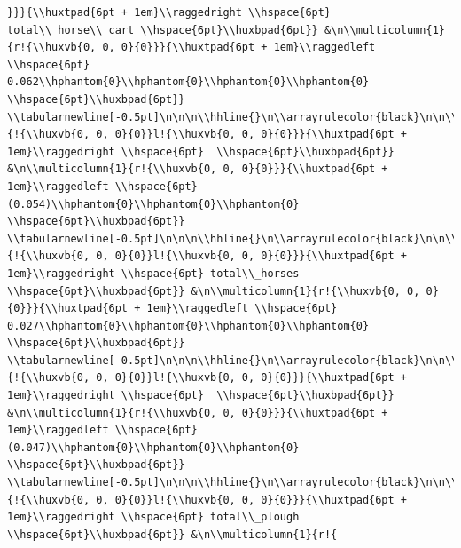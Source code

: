 \documentclass[11pt,preprint, authoryear]{elsarticle}
\numberwithin{equation}{section}
\numberwithin{figure}{section}
\numberwithin{table}{section}
\begin{document}
\begin{verbatim}
}}}{\\huxtpad{6pt + 1em}\\raggedright \\hspace{6pt} total\\_horse\\_cart \\hspace{6pt}\\huxbpad{6pt}} &\n\\multicolumn{1}{r!{\\huxvb{0, 0, 0}{0}}}{\\huxtpad{6pt + 1em}\\raggedleft \\hspace{6pt} 0.062\\hphantom{0}\\hphantom{0}\\hphantom{0}\\hphantom{0} \\hspace{6pt}\\huxbpad{6pt}} \\tabularnewline[-0.5pt]\n\n\n\\hhline{}\n\\arrayrulecolor{black}\n\n\\multicolumn{1}{!{\\huxvb{0, 0, 0}{0}}l!{\\huxvb{0, 0, 0}{0}}}{\\huxtpad{6pt + 1em}\\raggedright \\hspace{6pt}  \\hspace{6pt}\\huxbpad{6pt}} &\n\\multicolumn{1}{r!{\\huxvb{0, 0, 0}{0}}}{\\huxtpad{6pt + 1em}\\raggedleft \\hspace{6pt} (0.054)\\hphantom{0}\\hphantom{0}\\hphantom{0} \\hspace{6pt}\\huxbpad{6pt}} \\tabularnewline[-0.5pt]\n\n\n\\hhline{}\n\\arrayrulecolor{black}\n\n\\multicolumn{1}{!{\\huxvb{0, 0, 0}{0}}l!{\\huxvb{0, 0, 0}{0}}}{\\huxtpad{6pt + 1em}\\raggedright \\hspace{6pt} total\\_horses \\hspace{6pt}\\huxbpad{6pt}} &\n\\multicolumn{1}{r!{\\huxvb{0, 0, 0}{0}}}{\\huxtpad{6pt + 1em}\\raggedleft \\hspace{6pt} 0.027\\hphantom{0}\\hphantom{0}\\hphantom{0}\\hphantom{0} \\hspace{6pt}\\huxbpad{6pt}} \\tabularnewline[-0.5pt]\n\n\n\\hhline{}\n\\arrayrulecolor{black}\n\n\\multicolumn{1}{!{\\huxvb{0, 0, 0}{0}}l!{\\huxvb{0, 0, 0}{0}}}{\\huxtpad{6pt + 1em}\\raggedright \\hspace{6pt}  \\hspace{6pt}\\huxbpad{6pt}} &\n\\multicolumn{1}{r!{\\huxvb{0, 0, 0}{0}}}{\\huxtpad{6pt + 1em}\\raggedleft \\hspace{6pt} (0.047)\\hphantom{0}\\hphantom{0}\\hphantom{0} \\hspace{6pt}\\huxbpad{6pt}} \\tabularnewline[-0.5pt]\n\n\n\\hhline{}\n\\arrayrulecolor{black}\n\n\\multicolumn{1}{!{\\huxvb{0, 0, 0}{0}}l!{\\huxvb{0, 0, 0}{0}}}{\\huxtpad{6pt + 1em}\\raggedright \\hspace{6pt} total\\_plough \\hspace{6pt}\\huxbpad{6pt}} &\n\\multicolumn{1}{r!{
\end{verbatim}
\end{document}
